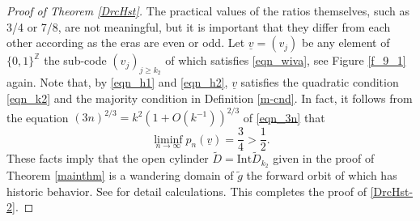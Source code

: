 \documentclass{amsart}
\theoremstyle{definition}
\numberwithin{equation}{section}
\numberwithin{figure}{section}
\begin{document}
\begin{proof}[Proof of Theorem \ref{DrcHst}]
The practical values of the ratios themselves, such as 3/4 or 7/8, are not meaningful, 
but it is important that they differ from each other according as the eras are even or odd.
Let $\underline{v}=(v_j)$ be any element of $\{0,1\}^{\mathbb{Z}}$ the sub-code 
$(v_j)_{j\geq k_2}$ of which satisfies \eqref{eqn_wiva}, 
see Figure \ref{f_9_1} again.
Note that, by \eqref{eqn_h1} and \eqref{eqn_h2}, $\underline{v}$ satisfies the quadratic condition 
\eqref{eqn_k2} and 
the majority condition  in  Definition \ref{m-cnd}. 
In fact, it follows from the equation $(3n)^{2/3}=k^{2}(1+O(k^{-1}))^{2/3}$ of \eqref{eqn_3n} that 
\[
\liminf_{n\to \infty}p_{n}(\underline{v})=\frac{3}{4}>\frac{1}{2}. 
\]
These facts imply that the open cylinder $\widetilde D=\mathrm{Int}\widetilde D_{k_2}$ given in the proof of Theorem \ref{mainthm} 
is a wandering domain of $\widetilde g$ the forward orbit of which 
has historic behavior. 
See \cite[Theorem 5.1]{KNS23}  for detail calculations. 
 This completes the proof of \eqref{DrcHst-2}.
 \end{proof}
 
 
 
\end{document}
